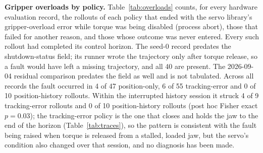 \documentclass{article}
\begin{document}
\textbf{Gripper overloads by policy.} Table~\ref{tab:overloads} counts, for
every hardware evaluation record, the rollouts of each policy that ended with
the servo library's gripper-overload error while torque was being disabled
(process abort), those that failed for another reason, and those whose outcome
was never entered. Every such rollout had completed its control horizon. The
seed-0 record predates the shutdown-status field; its runner wrote the
trajectory only after torque release, so a fault would have left a missing
trajectory, and all 40 are present. The 2026-09-04 residual comparison
predates the field as well and is not tabulated. Across all records the fault
occurred in 4 of 47 position-only, 6 of 55 tracking-error and 0 of 10
position-history rollouts. Within the interrupted history session it struck 4
of 9 tracking-error rollouts and 0 of 10 position-history rollouts (post hoc
Fisher exact $p=0.03$); the tracking-error policy is the one that closes and
holds the jaw to the end of the horizon (Table~\ref{tab:traces}), so the
pattern is consistent with the fault being raised when torque is released
from a stalled, loaded jaw, but the servo's condition also changed over that
session, and no diagnosis has been made.

\begin{table}[h]
\centering
\small
\caption{Gripper overload incidents per policy. Rollouts counts labeled
outcomes plus any completed rollout whose outcome was not entered. Overload:
the servo library raised its overload error while torque was being disabled
after a completed horizon. Other failed exit: a non-overload process failure
(one logging fault). Generated from the trial records and incident files under
\texttt{results/hardware/}.}
\label{tab:overloads}
\resizebox{\linewidth}{!}{}
\end{table}
\end{document}
